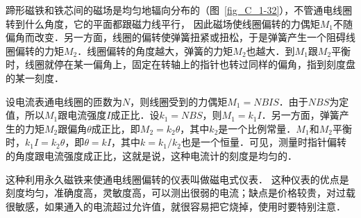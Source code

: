 蹄形磁铁和铁芯间的磁场是均匀地辐向分布的（图~\ref{fig_C_1-32}），不管通电线圈转到什么角度，它的平面都跟磁力线平行，
因此磁场使线圈偏转的力偶矩$M_1$不随偏角而改变．另一方面，线圈的偏转使弹簧扭紧或扭松，于是弹簧产生一个阻碍线圈偏转的力矩$M_2$．线圈偏转的角度越大，弹簧的力矩$M_2$也越大．到$M_1$跟$M_2$平衡时，线圈就停在某一偏角上，固定在转轴上的指针也转过同样的偏角，指到刻度盘的某一刻度．

设电流表通电线圈的匝数为$N$，则线圈受到的力偶矩$M_1=NBIS$．由于$NBS$为定值，所以$M_1$跟电流强度$I$成正比．设$k_1=NBS$，则$M_1=k_1I$．另一方面，弹簧产生的力矩$M_2$跟偏角$\theta$成正比，即$M_2=k_2\theta$，其中$k_2$是一个比例常量．$M_1$和$M_2$平衡时，$k_1I=k_2\theta$，即$\theta =kI$，其中$k=k_1/k_2$也是一个恒量．可见，测量时指针偏转的角度跟电流强度成正比，这就是说，这种电流计的刻度是均匀的．

这种利用永久磁铁来使通电线圈偏转的仪表叫做磁电式仪表．
这种仪表的优点是刻度均匀，准确度高，灵敏度高，可以测出很弱的电流；缺点是价格较贵，对过载很敏感，如果通入的电流超过允许值，就很容易把它烧掉，使用时要特别注意．

